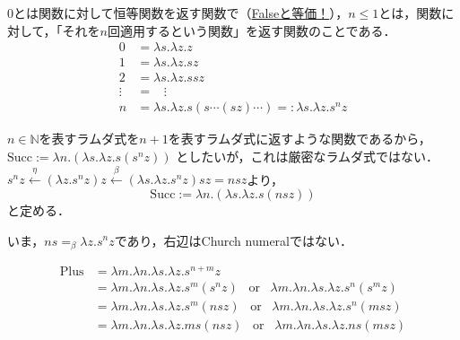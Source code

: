\documentclass[uplatex, dvipdfmx]{jsreport}
\begin{document}
\begin{shadebox}\begin{definition}
    $0$とは関数に対して恒等関数を返す関数で（\underline{Falseと等価！}），$n\le 1$とは，関数に対して，「それを$n$回適用するという関数」を返す関数のことである．
    \begin{align*}
        0 &= \lambda s.\lambda z.z \\
        1 &= \lambda s.\lambda z.sz \\
        2 &= \lambda s.\lambda z.ssz \\
        \!\!\vdots &= \;\;\; \vdots \\
        n &= \lambda s.\lambda z.s(s\cdots (sz)\cdots ) =: \lambda s.\lambda z.s^nz
    \end{align*}
\end{definition}\end{shadebox}

\begin{definition}[後者関数]
    $n\in\mathbb{N}$を表すラムダ式を$n+1$を表すラムダ式に返すような関数であるから，
    $\mathrm{Succ}:=\lambda n.(\lambda s.\lambda z.s(s^nz))$
    としたいが，これは厳密なラムダ式ではない．$s^nz\xleftarrow{\eta}(\lambda z.s^nz)z\xleftarrow{\beta}(\lambda s.\lambda z.s^nz)sz=nsz$より，
    \[ \mathrm{Succ}:=\lambda n.(\lambda s.\lambda z.s(nsz)) \]
    と定める．
\end{definition}
\begin{remark}
    いま，$ns=_\beta \lambda z.s^nz$であり，右辺はChurch numeralではない．
\end{remark}

\begin{definition}[加法]
    \begin{align*}
        \mathrm{Plus} &= \lambda m.\lambda n.\lambda s.\lambda z.s^{n+m}z \\
        &= \lambda m.\lambda n.\lambda s.\lambda z.s^m(s^nz)\;\;\;\mathrm{or}\;\;\; \lambda m.\lambda n.\lambda s.\lambda z.s^n(s^mz) \\
        &= \lambda m.\lambda n.\lambda s.\lambda z.s^m(nsz)\;\;\;\mathrm{or}\;\;\; \lambda m.\lambda n.\lambda s.\lambda z.s^n(msz) \\
        &= \lambda m.\lambda n.\lambda s.\lambda z.ms(nsz)\;\;\;\mathrm{or}\;\;\; \lambda m.\lambda n.\lambda s.\lambda z.ns(msz)
    \end{align*}
\end{definition}
\end{document}
